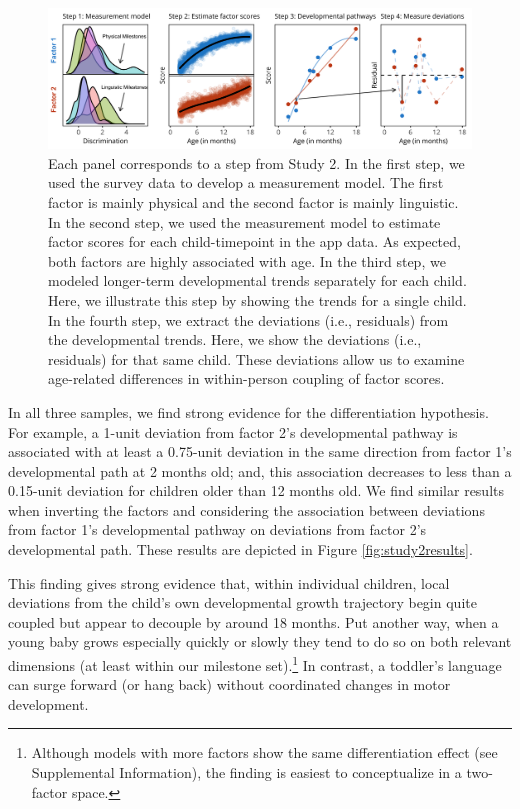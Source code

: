 \documentclass[man, floatsintext]{apa7}
\begin{document}
\begin{figure}[t!]
\centering
\includegraphics[width=1\columnwidth]{figures/bigfigure.png}
\caption{Each panel corresponds to a step from Study 2. In the first step, we used the survey data to develop a measurement model. The first factor is mainly physical and the second factor is mainly linguistic. In the second step, we used the measurement model to estimate factor scores for each child-timepoint in the app data. As expected, both factors are highly associated with age. In the third step, we modeled longer-term developmental trends separately for each child. Here, we illustrate this step by showing the trends for a single child. In the fourth step, we extract the deviations (i.e., residuals) from the developmental trends. Here, we show the deviations (i.e., residuals) for that same child. These deviations allow us to examine age-related differences
in within-person coupling of factor scores.}
\label{fig:study2}
\end{figure}

In all
three samples, we find strong evidence for the differentiation
hypothesis. For example, a 1-unit deviation from factor 2's
developmental pathway is associated with at least a 0.75-unit deviation
in the same direction from factor 1's developmental path at 2 months
old; and, this association decreases to less than a 0.15-unit deviation
for children older than 12 months old. We find similar results when
inverting the factors and considering the association between deviations
from factor 1's developmental pathway on deviations from factor 2's
developmental path. These results are depicted in Figure
\ref{fig:study2results}.

This finding gives strong evidence that, within individual children, local deviations from the child's own developmental growth trajectory begin quite coupled but appear to decouple by around 18 months. Put another way, when a young baby grows especially quickly or slowly they tend to do so on both relevant dimensions (at least within our milestone set).\footnote{Although models with more factors show the same differentiation effect (see Supplemental Information), the finding is easiest to conceptualize in a two-factor space.} In contrast, a toddler's language can surge forward (or hang back) without coordinated changes in motor development.
\end{document}
